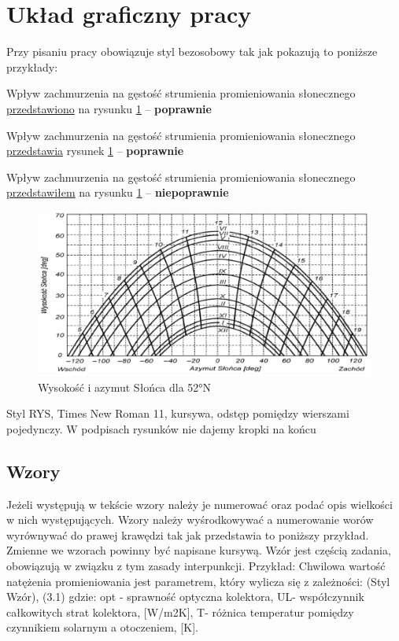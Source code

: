 \documentclass[11pt,a4paper]{article}
\begin{document}
\newpage

\section{Układ graficzny pracy}

\indent Przy pisaniu pracy obowiązuje styl bezosobowy tak jak pokazują to poniższe przykłady:  

\noindent Wpływ zachmurzenia na gęstość strumienia promieniowania słonecznego \underline{przedstawiono} na rysunku \ref{fig:azymut-slonca} – \textbf{poprawnie}

\noindent Wpływ zachmurzenia na gęstość strumienia promieniowania słonecznego \underline{przedstawia} rysunek \ref{fig:azymut-slonca} – \textbf{poprawnie}

\noindent Wpływ zachmurzenia na gęstość strumienia promieniowania słonecznego \underline{przedstawiłem} na rysunku \ref{fig:azymut-slonca} – \textbf{niepoprawnie}

\begin{figure}[H]
    \centering
    \includegraphics[width=0.75\linewidth]{media/azymut_slonca.png}
    \caption{Wysokość i azymut Słońca dla 52°N}
    \label{fig:azymut-slonca}
\end{figure}

Styl RYS, Times New Roman 11, kursywa, odstęp pomiędzy wierszami pojedynczy. W podpisach rysunków nie dajemy kropki na końcu

\subsection{Wzory}

Jeżeli występują w tekście \cite{ksiazka} wzory należy je numerować oraz podać opis wielkości w nich występujących. Wzory należy wyśrodkowywać a numerowanie worów wyrównywać do prawej krawędzi tak jak przedstawia to poniższy przykład. Zmienne we wzorach powinny być napisane kursywą. Wzór jest częścią zadania, obowiązują w związku z tym zasady interpunkcji.   
Przykład:
Chwilowa wartość natężenia promieniowania jest parametrem, który wylicza się z zależności:
	  (Styl Wzór),	(3.1)
gdzie:
opt - sprawność optyczna kolektora,
UL- współczynnik całkowitych strat kolektora, [W/m2K],
T- różnica temperatur pomiędzy czynnikiem solarnym a otoczeniem, [K].
\end{document}
